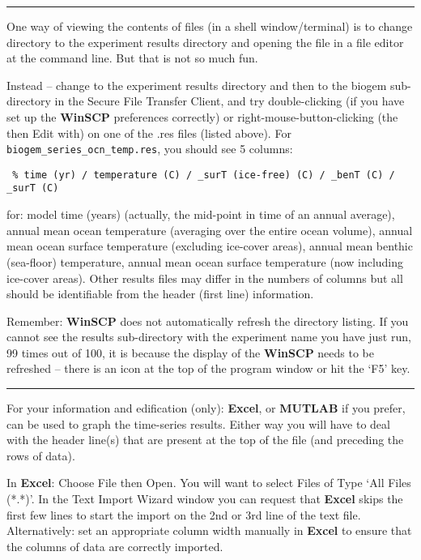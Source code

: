 \vspace{1mm}
\noindent\rule{4cm}{0.1mm}
\vspace{2mm}

\noindent One way of viewing the contents of files (in a shell window/terminal) is to change directory to the experiment results directory and opening the file in a file editor at the command line. But that is not so much fun.

Instead – change to the experiment results directory and then to the \textsf{\footnotesize biogem} sub-directory in the Secure File Transfer Client, and try double-clicking (if you have set up the \textbf{WinSCP} preferences correctly) or right-mouse-button-clicking (the then Edit with) on one of the .res files (listed above). For \texttt{biogem\_series\_ocn\_temp.res}, you should see 5 columns:
\small\begin{verbatim}
 % time (yr) / temperature (C) / _surT (ice-free) (C) / _benT (C) / _surT (C)
\end{verbatim}\normalsize
for: model time (years) (actually, the mid-point in time of an annual average), annual mean ocean temperature (averaging over the entire ocean volume), annual mean ocean surface temperature (excluding ice-cover areas), annual mean benthic (sea-floor) temperature, annual mean ocean surface temperature (now including ice-cover areas). Other results files may differ in the numbers of columns but all should be identifiable from the header (first line) information.

Remember: \textbf{WinSCP} does not automatically refresh the directory listing. If you cannot see the results sub-directory with the experiment name you have just run, 99 times out of 100, it is because the display of the \textbf{WinSCP} needs to be refreshed -- there is an icon at the top of the program window or hit the ‘\textsf{\footnotesize F5}’ key.

\vspace{1mm}
\noindent\rule{4cm}{0.1mm}
\vspace{2mm}

\noindent For your information and edification (only): \textbf{Excel}, or \textbf{MUTLAB} if you prefer, can be used to graph the time-series results. Either way you will have to deal with the header line(s) that are present at the top of the file (and preceding the rows of data).

In \textbf{Excel}: Choose \textsf{\footnotesize File} then \textsf{\footnotesize Open}.  You will want to select \textsf{\footnotesize Files of Type} ‘\textsf{\footnotesize All Files (*.*)}’. In the \textsf{\footnotesize Text Import Wizard} window you can request that \textbf{Excel} skips the first few lines to start the import on the 2nd or 3rd line of the text file. Alternatively: set an appropriate column width manually in \textbf{Excel} to ensure that the columns of data are correctly imported.

